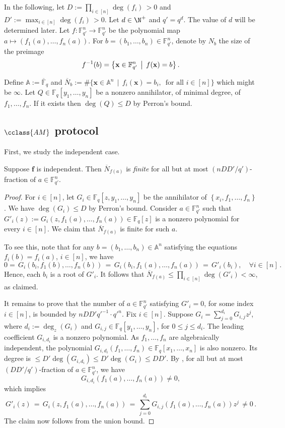 \documentclass{toc}
\newcommand{\F}{\mathbb{F}}
\newcommand{\aff}{\mathbb{A}}
\newcommand{\ol}[1]{\overline{#1}}
\newcommand{\inbrace }[1]{\left\{#1\right\}}
\newcommand{\AM}{\cclass{AM}\xspace}  %
\begin{document}
 In the following, let $D:=\prod_{i\in [n]}\deg(f_i) \,>0$ and $D':=\max_{i\in [n]} \deg(f_i) \,>0$. Let $d\in\N^+$ and $q'=q^d$. The value of $d$ will be determined later.
 Let $f:\F_{q'}^n\to\F_{q'}^n$ be the polynomial map $a\mapsto (f_1(a),\dots,f_n(a))$. For $b=(b_1,\dots,b_n)\in \F_{q'}^n$, denote by $N_b$ the size of the preimage
 \[
   f^{-1}(b)=\left\{\mathbf x \in \F_{q'}^n \,\bigm|\, f(\mathbf x) = b \right\}.
 \]

Define $\aff:=\ol{\F}_q$ and $\overline{N}_b:= \#\{\mathbf x \in \aff^n \,\mid\, f_i(\mathbf x) = b_i, \, \text{ for all } i\in[n] \}$ which might be $\infty$.
Let $Q\in\F_q[y_1,\dots,y_n]$ be a nonzero annihilator, of minimal degree, of $f_1,\dots,f_n$. If it exists then $\deg(Q)\leq D$ by Perron's bound. 

\subsection{\texorpdfstring{$\AM$}{AM} protocol}

First, we study the independent case.

%
%
\begin{lemma}\label{lem_finite}
Suppose $\mathbf f$
%
is  %
independent. Then $\overline{N}_{f(a)}$ is \emph{finite} for all but at most $(nDD'/q')$-fraction of $a\in\F_{q'}^n$.
\end{lemma}
\begin{proof}
For $i\in [n]$, let $G_i\in\F_q[z, y_1,\dots,y_n]$ be the annihilator of $\inbrace{x_i, f_1,\dots,f_n}$. We have $\deg(G_i)\leq D$ by Perron's bound. 
Consider $a\in\F_{q'}^n$ such that  $G'_i(z):= G_i(z, f_1(a),\dots,f_n(a))\in\F_q[z]$ is a nonzero polynomial for every $i\in [n]$.
We claim that $\overline{N}_{f(a)}$ is finite for such $a$. 

To see this, note that for any $b=(b_1,\dots,b_n)\in \aff^n$ satisfying the equations $f_i(b)=f_i(a)$, $i\in[n]$, we have
\[
0=\, G_i(b_i, f_1(b), \dots, f_n(b)) \,=\, G_i(b_i, f_1(a),\dots, f_n(a)) \,=\, G'_i(b_i), \quad\forall i\in [n] \,.
\]
Hence, each $b_i$ is a root of $G'_i$. It follows that $\overline{N}_{f(a)} \leq \prod_{i\in[n]} \deg(G'_i) < \infty$, as claimed. 

It remains to prove  that the number of $a\in\F_{q'}^n$ satisfying $G'_i=0$, for some index $i\in [n]$, is bounded by $nDD'q'^{-1}\cdot q'^{n}$.
Fix $i\in [n]$. Suppose $G_i=\sum_{j=0}^{d_i} G_{i,j} z^j$, where $d_i:=\deg_z(G_i)$ and $G_{i,j}\in \F_q[y_1,\dots,y_n]$, for $0\leq j\leq d_i$.
The leading coefficient $G_{i,d_i}$ is a nonzero polynomial. As $f_1,\dots,f_n$ are algebraically independent, the polynomial $G_{i,d_i}(f_1,\dots,f_n)\in\F_q[x_1,\dots,x_n]$ is also nonzero.
Its degree is $\le D'\deg(G_{i,d_i}) \leq D'\deg(G_i) \leq DD'$.
By 
%
,  %
for all but at most $(DD'/q')$-fraction of $a\in \F_{q'}^n$, we have 
%
\[
G_{i,d_i}(f_1(a),\dots,f_n(a))\neq 0,
\]  %
which   implies  
\[
G'_i(z) \,=\, G_i(z, f_1(a),\dots,f_n(a)) \,=\, \sum_{j=0}^{d_i} G_{i,j}(f_1(a),\dots,f_n(a)) z^j \,\neq 0 \,.
\]
The claim now follows from the union bound.
\end{proof}
\end{document}
